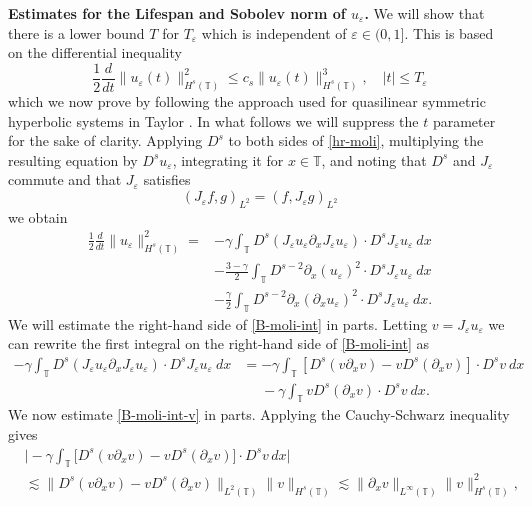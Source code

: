 \documentclass[12pt,reqno]{amsart}
\newcommand{\p}{\partial}
\newcommand{\ci}{\mathbb{T}}
\newcommand{\ee}{\varepsilon}
\theoremstyle{plain}  %
\theoremstyle{definition}
\begin{document}
{\bf Estimates for the Lifespan and Sobolev norm of $u_\ee$.}
%
We will show that there is a lower bound  $T$
for $T_\ee$ which is independent of $\ee\in(0, 1]$.
This is based on the differential
inequality 
%
%
%
\begin{equation} \label{B-diff-ineq}
\frac 12
\frac{d}{dt}
\|u_\ee(t)\|_{H^{s}(\ci)}^2
\le
c_s
\|u_\ee(t)\|_{H^{s}(\ci)}^3,
\quad
|t| \le T_\ee
\end{equation}
%
%
%
%
which we now prove by
following the approach used for quasilinear symmetric
hyperbolic systems in Taylor  \cite{Taylor_1991_Pseudodifferent}. In what 
follows we will suppress the
$t$ parameter for the sake of clarity.
%
%
%
Applying $D^s$ to both sides of  \eqref{hr-moli},
multiplying the resulting equation by $D^s u_\ee$,
integrating it for $x\in\ci$, and noting that 
$D^s$ and $J_\ee$ commute
and that  $J_\ee$ satisfies 
%
%
\begin{equation} 
\label{J-e-inner-prod-property}
(J_\ee f, g)_{L^2}=( f, J_\ee g)_{L^2}
\end{equation}
%
%
we obtain
%
%
%
\begin{equation} \begin{split}
\label{B-moli-int}
 \frac 12
\frac{d}{dt} \|u_\ee \|_{H^s(\ci)}^2
=
& -
\gamma \int_{\ci}  D^s(J_\ee u_\ee \partial_x J_\ee u_\ee) \cdot
D^s J_\ee u_\ee  \  dx
\\
&- \frac{3 -\gamma}{2} \int_{\ci} D^{s-2} \p_x (u_{\ee})^2 \cdot D^s J_\ee 
u_{\ee} \ dx
\\
& - \frac{\gamma}{2} \int_{\ci}  D^{s-2} \p_x (\p_x u_\ee)^2
\cdot D^s J_\ee u_\ee  \ dx.
\end{split}
\end{equation}
%
%
%
We will estimate the right-hand side of \eqref{B-moli-int} in parts.  
Letting $v=J_\ee u_\ee$ we can rewrite the first integral on the right-hand 
side of \eqref{B-moli-int} as 
%
%
%
\begin{equation} \begin{split}
\label{B-moli-int-v}
-  \gamma \int_{\ci}   D^s (J_{\ee} u_{\ee} \p_x J_\ee u_\ee)
\cdot D^s
J_{\ee}u_\ee \ dx & = - \gamma \int_\ci
\left [ D^s(v\p_x v)  -  v D^s (\p_xv)
\right ] \cdot D^s v \ dx
\\
& \phantom{=} - \gamma \int_\ci
v D^s (\p_xv) 
\cdot D^s v \ dx.
\end{split}
\end{equation}
%
%
%
%
%
We now estimate \eqref{B-moli-int-v} in parts. Applying the Cauchy-Schwarz 
inequality gives
%
%
%
\begin{equation} \label{int1-est-calc2}
\begin{split}
& \Big|
- \gamma \int_\ci
\big[ D^s(v\p_x v)  -  v D^s (\p_xv)
\big]
\cdot D^s v   \, dx
\Big|
\\
& \lesssim
\|
D^s(v\p_x v)  -  v D^s (\p_xv)
\|_{L^2(\ci)}
\|
v
\|_{H^s(\ci)}
\lesssim \| \p_x v \|_{L^\infty(\ci)} \| v \|_{H^s(\ci)}^2,
\end{split}
\end{equation}
\end{document}
